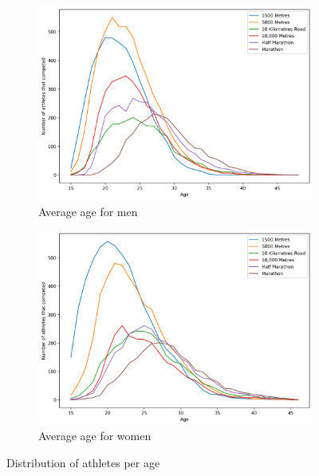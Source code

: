 \documentclass[10pt, a4paper]{article}
\begin{document}
\begin{figure}[htb]
    \centering
    \begin{subfigure}[b]{0.45\linewidth}
        \includegraphics[width=\linewidth]{Data/Figures/Men_Athletes_distribution.png}
        \caption{Average age for men}
        \label{fig:men_age}
    \end{subfigure}
    \hfill
    \begin{subfigure}[b]{0.45\linewidth}
        \includegraphics[width=\linewidth]{Data/Figures/Women_Athletes_distribution.png}
        \caption{Average age for women}
        \label{fig:women_age}
    \end{subfigure}
    \caption{Distribution of athletes per age}
    \label{fig:athletes_age}
\end{figure}
\end{document}
